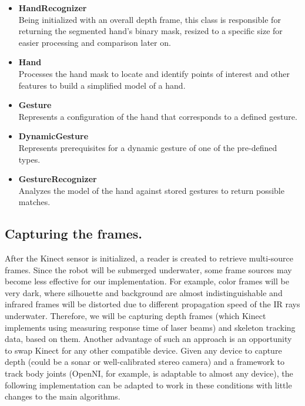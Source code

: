 \documentclass[a4paper,11pt,oneside]{article}
\begin{document}
\begin{itemize}
\item \textbf{HandRecognizer}\\
Being initialized with an overall depth frame, this class is responsible for returning the segmented hand's binary mask, resized to a specific size for easier processing and comparison later on.

\item \textbf{Hand}\\
Processes the hand mask to locate and identify points of interest and other features to build a simplified model of a hand.

\item \textbf{Gesture}\\
Represents a configuration of the hand that corresponds to a defined gesture.

\item \textbf{DynamicGesture}\\
Represents prerequisites for a dynamic gesture of one of the pre-defined types.

\item \textbf{GestureRecognizer}\\
Analyzes the model of the hand against stored gestures to return possible matches.

\end{itemize}

\subsection{Capturing the frames.}

After the Kinect sensor is initialized, a reader is created to retrieve multi-source frames.  Since the robot will be submerged underwater, some frame sources may become less effective for our implementation. For example, color frames will be very dark, where silhouette and background are almost indistinguishable and infrared frames will be distorted due to different propagation speed of the IR rays underwater. Therefore, we will be capturing depth frames (which Kinect implements using measuring response time of laser beams) and skeleton tracking data, based on them. Another advantage of such an approach is an opportunity to swap Kinect for any other compatible device. Given any device to capture depth (could be a sonar or well-calibrated stereo camera) and a framework to track body joints (OpenNI, for example, is adaptable to almost any device), the following implementation can be adapted to work in these conditions with little changes to the main algorithms.
\end{document}
